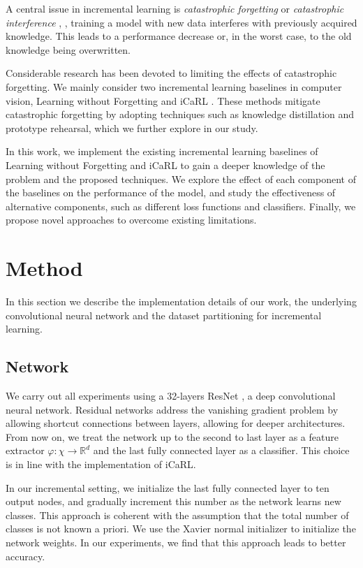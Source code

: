 \documentclass[10pt,twocolumn,letterpaper]{article}
\begin{document}
A central issue in incremental learning is \emph{catastrophic forgetting} or \emph{catastrophic interference} \cite{parisi:2019}, \ie, training a model with new data interferes with previously acquired knowledge. This leads to a performance decrease or, in the worst case, to the old knowledge being overwritten.

Considerable research has been devoted to limiting the effects of catastrophic forgetting. We mainly consider two incremental learning baselines in computer vision, Learning without Forgetting \cite{li:2016} and iCaRL \cite{rebuffi:2017}. These methods mitigate catastrophic forgetting by adopting techniques such as knowledge distillation and prototype rehearsal, which we further explore in our study.

In this work, we implement the existing incremental learning baselines of Learning without Forgetting and iCaRL to gain a deeper knowledge of the problem and the proposed techniques. We explore the effect of each component of the baselines on the performance of the model, and study the effectiveness of alternative components, such as different loss functions and classifiers. Finally, we propose novel approaches to overcome existing limitations.

\section{Method}
In this section we describe the implementation details of our work, the underlying convolutional neural network and the dataset partitioning for incremental learning.

\subsection{Network}
We carry out all experiments using a 32-layers ResNet \cite{he:2016}, a deep convolutional neural network. Residual networks address the vanishing gradient problem by allowing shortcut connections between layers, allowing for deeper architectures. From now on, we treat the  network up to the second to last layer as a feature extractor $\varphi: \chi \to \mathbb{R}^{d}$ and the last fully connected layer as a classifier. This choice is in line with the implementation of iCaRL.

In our incremental setting, we initialize the last fully connected layer to ten output nodes, and gradually increment this number as the network learns new classes. This approach is coherent with the assumption that the total number of classes is not known a priori. We use the Xavier normal initializer \cite{glorot:2010} to initialize the network weights. In our experiments, we find that this approach leads to better accuracy.
\end{document}
